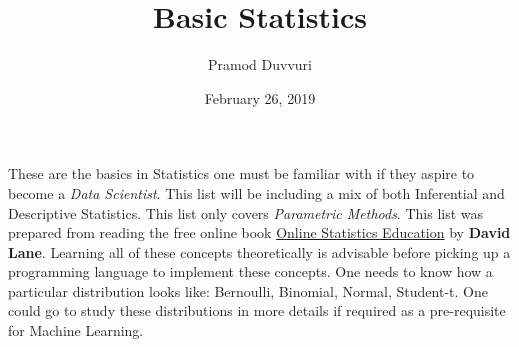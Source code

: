 \documentclass[11pt]{article}
\title{Basic Statistics}
\author{Pramod Duvvuri}
\date{February 26, 2019}
\begin{document}
	\maketitle
	These are the basics in Statistics one must be familiar with if they aspire to become a \textit{Data Scientist}. This list will be including a mix of both Inferential and Descriptive Statistics. This list only covers \textit{Parametric Methods}. This list was prepared from reading the free online book \href{http://onlinestatbook.com}{Online Statistics Education} by \textbf{David Lane}. Learning all of these concepts theoretically is advisable before picking up a programming language to implement these concepts. One needs to know how a particular distribution looks like: Bernoulli, Binomial, Normal, Student-t. One could go to study these distributions in more details if required as a pre-requisite for Machine Learning.
\end{document}
